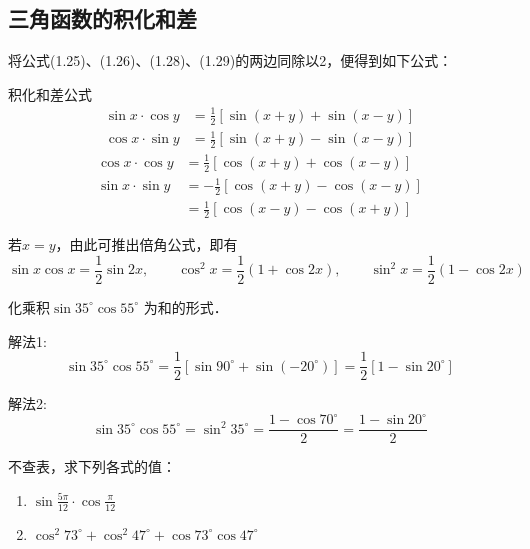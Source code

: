 \subsection{三角函数的积化和差}
将公式(1.25)、(1.26)、(1.28)、(1.29)的两边同除以2，便得到如下公式：

\begin{blk}{积化和差公式}
\begin{align*}
\sin x\cdot\cos y  &= \frac{1}{2} [\sin (x+y) +\sin (x-y)] \tag{V}\\
\cos x\cdot \sin y &=\frac{1}{2}  [\sin (x+y)-\sin (x-y)] \tag{VI} 
\end{align*} 
\begin{align*}
\cos x\cdot\cos y  &= \frac{1}{2} [\cos (x+y) +\cos (x-y)] \tag{VII}\\
\sin x\cdot \sin y &=-\frac{1}{2}  [\cos (x+y)-\cos (x-y)]  \\
&=\frac{1}{2}[\cos (x-y)-\cos (x+y)] \tag{VIII}
\end{align*} 
\end{blk}

若$x=y$，由此可推出倍角公式，即有
\[\sin x\cos x=\frac{1}{2}\sin 2x,\qquad \cos^2 x=\frac{1}{2}(1+\cos 2x),\qquad \sin^2x=\frac{1}{2}(1-\cos2x)\]

\begin{example}
    化乘积$\sin35^{\circ} \cos55^{\circ}$ 为和的形式．
\end{example}

\begin{solution}
解法1: 
\[\sin35^{\circ} \cos55^{\circ} =\frac{1}{2}[\sin90^{\circ} +\sin (-20^{\circ} ) ]
=\frac{1}{2} [1-\sin20^{\circ} ]\]

解法2:
\[\sin35^{\circ} \cos55^{\circ}=\sin^2 35^{\circ} =\frac{1-\cos 70^{\circ}}{2}=\frac{1-\sin 20^{\circ}}{2}\]
\end{solution}


\begin{example}
    不查表，求下列各式的值：
\begin{enumerate}
    \item $\sin\frac{5\pi}{12}\cdot\cos\frac{\pi}{12}$
    \item $\cos^2 73^{\circ} +\cos^2 47^{\circ} +\cos73^{\circ} \cos47^{\circ}$
\end{enumerate}
\end{example}

